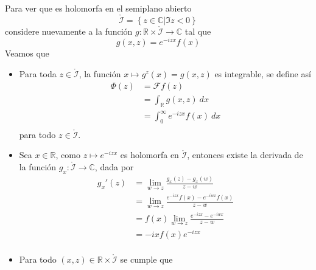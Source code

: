 \documentclass[12pt]{report}
\theoremstyle{largebreak}
\newcommand\cf[3]{\ensuremath{#1:#2\rightarrow#3}}
\newcommand{\fou}[1]{\ensuremath{\mathcal{F}#1}}
\begin{document}
\begin{sol}
        Para ver que es holomorfa en el semiplano abierto
        \begin{equation*}
            \mathring{\mathcal{I}}=\left\{z\in\mathbb{C}\Big|\Im z<0 \right\}
        \end{equation*}
        considere nuevamente a la función $\cf{g}{\mathbb{R}\times\mathring{\mathcal{I}}}{\mathbb{C}}$ tal que
        \begin{equation*}
            g(x,z)=e^{ -izx}f(x)
        \end{equation*}
        Veamos que
        \begin{itemize}
            \item Para toda $z\in\mathring{\mathcal{I}}$, la función $x\mapsto g^z(x)=g(x,z)$ es integrable, se define así
            \begin{equation*}
                \begin{split}
                    \Phi(z)&=\fou{f}(z)\\
                    &=\int_{\mathbb{R}}g(x,z)\:dx\\
                    &=\int_0^{\infty}e^{-izx}f(x)\:dx\\
                \end{split}
            \end{equation*}
            para todo $z\in\mathring{\mathcal{I}}$.
            \item Sea $x\in\mathbb{R}$, como $z\mapsto e^{ -izx}$ es holomorfa en $\mathring{\mathcal{I}}$, entonces existe la derivada de la función $\cf{g_x}{\mathring{\mathcal{I}}}{\mathbb{C}}$, dada por
            \begin{equation*}
                \begin{split}
                    g_x'(z)&=\lim_{ w\rightarrow z}\frac{g_x(z)-g_x(w)}{z-w}\\
                    &=\lim_{ w\rightarrow z}\frac{e^{ -izx}f(x)-e^{ -iwx}f(x)}{z-w}\\
                    &=f(x)\lim_{ w\rightarrow z}\frac{e^{ -izx}-e^{ -iwx}}{z-w}\\
                    &=-ixf(x)e^{ -izx}\\
                \end{split}
            \end{equation*}
            \item Para todo $(x,z)\in\mathbb{R}\times\mathring{\mathcal{I}}$ se cumple que
            \begin{equation*}
                \begin{split}

\end{split}
\end{equation*}
\end{itemize}
\end{sol}
\end{document}
